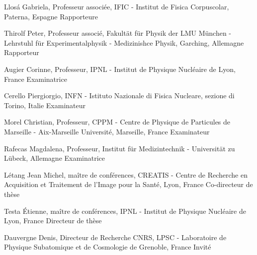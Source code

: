 Llos\'{a} Gabriela, Professeur associ\'{e}e, IFIC - Institut de Fisica Corpuscolar, Paterna, Espagne \newline \hfill Rapporteure

Thirolf Peter, Professeur associ\'{e}, Fakult\"{a}t f\"{u}r Physik der LMU M\"{u}nchen - Lehrstuhl f\"{u}r Experimentalphysik - Medizinishce Physik, Garching, Allemagne \newline \hfill Rapporteur

Augier Corinne, Professeur, IPNL - Institut de Physique Nucl\'{e}aire de Lyon, France \newline \hfill Examinatrice

Cerello Piergiorgio, INFN - Istituto Nazionale di Fisica Nucleare, sezione di Torino, Italie \newline \hfill Examinateur

Morel Christian, Professeur, CPPM - Centre de Physique de Particules de Marseille - Aix-Marseille Universit\'{e}, Marseille, France \newline \hfill Examinateur

Rafecas Magdalena, Professeur, Institut f\"{u}r Medizintechnik - Universit\"{a}t zu L\"{u}beck, Allemagne \newline \hfill Examinatrice

\bigskip

L\'{e}tang Jean Michel, ma\^{i}tre de conf\'{e}rences, CREATIS - Centre de Recherche en Acquisition et Traitement de l'Image pour la Sant\'{e}, Lyon, France \newline \hfill Co-directeur de th\`{e}se %

Testa \'{E}tienne, ma\^{i}tre de conf\'{e}rences, IPNL - Institut de Physique Nucl\'{e}aire de Lyon, France \newline  \hfill Directeur de th\`{e}se

\bigskip

Dauvergne Denis, Directeur de Recherche CNRS, LPSC - Laboratoire de Physique Subatomique et de Cosmologie de Grenoble, France \newline  \hfill Invit\'{e} %

\newpage

%